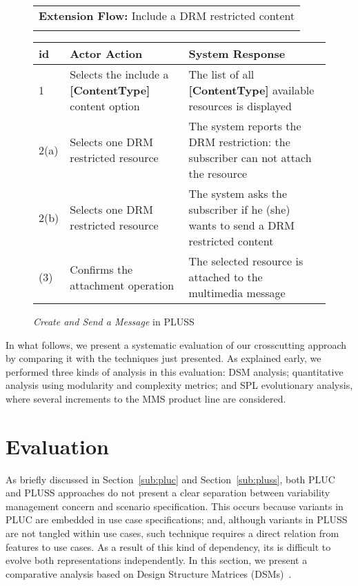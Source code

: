 \documentclass{acm_proc_article-sp}
\begin{document}
\begin{figure}[h]
\begin{center}
\begin{tiny}
{\begin{tabular}{|p{0.2in}|p{1.4in}|p{1.4in}|}
  \end{tabular} 
  \begin{tabular}{l} 
     \\
    {\bf Extension Flow:}  Include a DRM restricted content \\ \\
  \end{tabular}
  \begin{tabular}{|p{0.2in}|p{1.4in}|p{1.4in}|}
   \hline
   id & Actor Action & System Response \\ \hline 
   1 & Selects the include a {\bf [ContentType]} content option & The list of all {\bf [ContentType]} available resources is displayed \\ \hline
   2(a) & Selects one DRM restricted resource & The system reports the DRM restriction: the subscriber can not attach the resource \\ \hline
   2(b) & Selects one DRM restricted resource & The system asks the subscriber if he (she) wants to send a DRM restricted content \\ \hline
   (3)  & Confirms the attachment operation     & The selected resource is attached to the multimedia message \\ \hline
  \end{tabular} 
 } 
\end{tiny}
\end{center}
\caption{\emph{Create and Send a Message} in PLUSS}
\label{fig:pluss-01}

\end{figure}

In what follows, we present a systematic evaluation of our crosscutting approach by comparing it with the techniques just presented. As 
explained early, we performed three kinds of analysis in this evaluation: DSM analysis; quantitative analysis using modularity and 
complexity metrics; and SPL evolutionary analysis, where several increments to the MMS product line are considered.

\section{Evaluation}
\label{evaluation}

As briefly discussed in Section~\ref{sub:pluc} and Section~\ref{sub:pluss}, both PLUC and PLUSS approaches do not present a
clear separation between variability management concern and scenario specification. This occurs because variants in PLUC 
are embedded in use case specifications; and, although variants in PLUSS are not tangled within use cases, such technique 
requires a direct relation from features to use cases. As a result of this kind of dependency, its is difficult to evolve both 
representations independently. 
In this section, 
we present a comparative analysis based on Design Structure Matrices (DSMs)~\cite{clark-design-rules-book}. 
\end{document}
